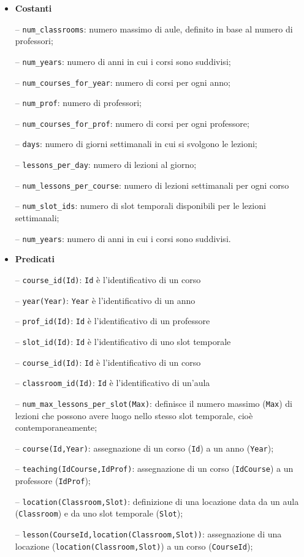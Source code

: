 \documentclass[a4paper,oneside,12pt]{book}
\def \code#1{\texttt{#1}}
\begin{document}
    \begin{itemize}[align=left]
        \item \textbf{Costanti}
        \item [-- \code{num\_classrooms}:] numero massimo di aule, definito in base al numero di professori;
        \item [-- \code{num\_years}:] numero di anni in cui i corsi sono suddivisi;
        \item [-- \code{num\_courses\_for\_year}:] numero di corsi per ogni anno;
        \item [-- \code{num\_prof}:]numero di professori;
        \item [-- \code{num\_courses\_for\_prof}:] numero  di corsi per ogni professore;
        \item [-- \code{days}:] numero di giorni settimanali in cui si svolgono le lezioni;
        \item [-- \code{lessons\_per\_day}:] numero di lezioni al giorno;
        \item [-- \code{num\_lessons\_per\_course}:] numero di lezioni settimanali per ogni corso
        \item [-- \code{num\_slot\_ids}:] numero di slot temporali disponibili per le lezioni settimanali;

        \item [-- \code{num\_years}:] numero di anni in cui i corsi sono suddivisi.
        \item \textbf{Predicati}
        \item [--] \code{course\_id(Id)}: \texttt{Id} è l'identificativo di un corso
        \item [--] \texttt{year(Year)}: \texttt{Year} è l'identificativo di un anno
        \item [--] \texttt{prof\_id(Id)}: \texttt{Id} è l'identificativo di un professore
        \item [--] \texttt{slot\_id(Id)}: \texttt{Id} è l'identificativo di uno slot temporale
        \item [--] \texttt{course\_id(Id)}: \texttt{Id} è l'identificativo di un corso
        \item [--] \texttt{classroom\_id(Id)}: \texttt{Id} è l'identificativo di un'aula

        \item [-- \code{num\_max\_lessons\_per\_slot(Max)}:] definisce il numero massimo (\code{Max}) di lezioni che possono avere luogo nello stesso slot temporale, cioè contemporaneamente;
        \item [-- \code{course(Id,Year)}:]  assegnazione di un corso (\code{Id}) a un anno (\code{Year});
        \item [-- \code{teaching(IdCourse,IdProf)}:] assegnazione di un corso (\code{IdCourse}) a un professore (\code{IdProf});
        \item [-- \code{location(Classroom,Slot)}:] definizione di una locazione data da un aula \\(\code{Class\-room}) e da uno slot temporale (\code{Slot});
        \item [-- \code{lesson(CourseId,location(Classroom,Slot))}:] assegnazione di una locazione (\code{location(Classroom,Slot)}) a un corso (\code{CourseId});


\end{itemize}
\end{document}
